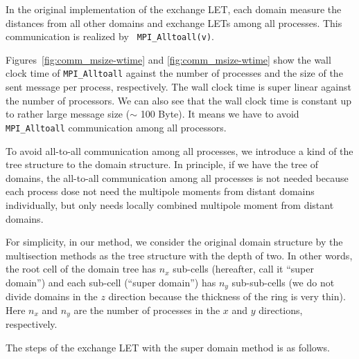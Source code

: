 \documentclass[oribibl]{llncs}
\begin{document}
In the original implementation of the exchange LET, each domain
measure the distances from all other domains and exchange LETs among
all processes. This communication is realized by {\tt
  MPI\_Alltoall(v)}.


Figures~\ref{fig:comm_msize-wtime} and \ref{fig:comm_msize-wtime} show
the wall clock time of {\tt MPI\_Alltoall} against the number of
processes and the size of the sent message per process,
respectively. The wall clock time is super linear against the number
of processors. We can also see that the wall clock time is constant up
to rather large message size ($\sim$ 100 Byte). It means we have to
avoid {\tt MPI\_Alltoall} communication among all processors.

To avoid all-to-all communication among all processes, we introduce a
kind of the tree structure to the domain structure. In principle, if
we have the tree of domains, the all-to-all communication among all
processes is not needed because each process dose not need the
multipole moments from distant domains individually, but only needs
locally combined multipole moment from distant domains.

For simplicity, in our method, we consider the original domain
structure by the multisection methods as the tree structure with the
depth of two. In other words, the root cell of the domain tree has
$n_x$ sub-cells (hereafter, call it ``super domain'') and each
sub-cell (``super domain'') has $n_y$ sub-sub-cells (we do not divide
domains in the $z$ direction because the thickness of the ring is very
thin). Here $n_x$ and $n_y$ are the number of processes in the $x$ and
$y$ directions, respectively.

The steps of the exchange LET with the super domain method is as
follows.
\end{document}
